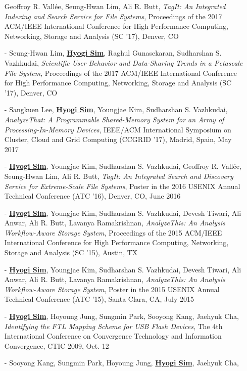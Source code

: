 \begin{itemize}[leftmargin=*]
  Geoffroy R. Vall\'ee, Seung-Hwan Lim, Ali R. Butt,
  {\it TagIt: An Integrated Indexing and Search Service for File Systems},
  Proceedings of the 2017 ACM/IEEE International Conference for High
  Performance Computing, Networking, Storage and Analysis (SC '17), Denver, CO
\item[-] Seung-Hwan Lim, \underline{\bf Hyogi Sim}, Raghul Gunasekaran,
  Sudharshan S. Vazhkudai,
  {\it Scientific User Behavior and Data-Sharing Trends in a Petascale File System},
  Proceedings of the 2017 ACM/IEEE International Conference for High
  Performance Computing, Networking, Storage and Analysis (SC '17), Denver, CO
\item[-] Sangkuen Lee, \underline{\bf Hyogi Sim}, Youngjae Kim,
  Sudharshan S. Vazhkudai,
  {\it AnalyzeThat: A Programmable Shared-Memory System for an Array of Processing-In-Memory Devices},
  IEEE/ACM International Symposium on Cluster, Cloud and Grid Computing
  (CCGRID '17), Madrid, Spain, May 2017
\item[-] \underline{\bf Hyogi Sim}, Youngjae Kim, Sudharshan S. Vazhkudai,
  Geoffroy R. Vall\'ee, Seung-Hwan Lim, Ali R. Butt,
  {\it TagIt: An Integrated Search and Discovery Service for Extreme-Scale File
  Systems},
  Poster in the 2016 USENIX Annual Technical Conference (ATC '16),
  Denver, CO, June 2016 %
\item[-] \underline{\bf Hyogi Sim}, Youngjae Kim, Sudharshan S. Vazhkudai,
  Devesh Tiwari, Ali Anwar, Ali R. Butt, Lavanya Ramakrishnan,
  {\it AnalyzeThis: An Analysis Workflow-Aware Storage System},
  Proceedings of the 2015 ACM/IEEE International Conference for High
  Performance Computing, Networking, Storage and Analysis (SC '15), Austin, TX
\item[-] \underline{\bf Hyogi Sim}, Youngjae Kim, Sudharshan S. Vazhkudai,
  Devesh Tiwari, Ali Anwar, Ali R. Butt, Lavanya Ramakrishnan,
  {\it AnalyzeThis: An Analysis Workflow-Aware Storage System},
  Poster in the 2015 USENIX Annual Technical Conference (ATC '15),
  Santa Clara, CA, July 2015
\item[-] \underline{\bf Hyogi Sim}, Hoyoung Jung, Sungmin Park, Sooyong Kang, Jaehyuk Cha,
  {\it Identifying the FTL Mapping Scheme for USB Flash Devices},
  The 4th International Conference on Convergence Technology
  and Information Convergence, CTIC 2009, Oct. 12
\item[-] Sooyong Kang, Sungmin Park, Hoyoung Jung, \underline{\bf Hyogi Sim}, Jaehyuk Cha,

\end{itemize}
